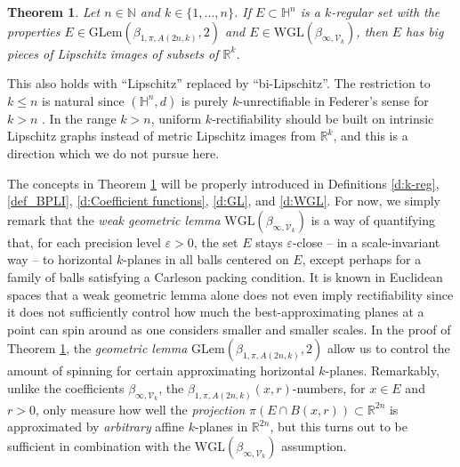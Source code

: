 \documentclass[12pt]{amsart}
\numberwithin{equation}{section}
\theoremstyle{plain}
\newtheorem{theorem}{Theorem}[section]
\theoremstyle{definition}
\theoremstyle{remark}
\begin{document}
\begin{theorem}\label{t:ImprovedHahlomaa}
Let $n\in \mathbb{N}$ and $k\in \{1,\ldots,n\}$. If $E\subset \mathbb{H}^n$ is a $k$-regular set with the properties $E\in \mathrm{GLem}(\beta_{1,\pi,A(2n,k)},2)$ and $E\in \mathrm{WGL}(\beta_{\infty,\mathcal{V}_k})$, then $E$ has big pieces of Lipschitz images of subsets of $\mathbb{R}^k$. 
\end{theorem}

This also holds with ``Lipschitz'' replaced by ``bi-Lipschitz''.
The restriction to $k\leq n$ is natural since  $(\mathbb{H}^n,d)$ is purely $k$-unrectifiable in Federer's sense for $k>n$ \cite{MR1800768,MR2105335}. In the range $k>n$,
uniform $k$-rectifiability should be built on intrinsic Lipschitz graphs \cite{MR2313532} instead of metric Lipschitz images from $\mathbb{R}^k$, and this is a direction which we do not pursue here. 


The concepts in Theorem \ref{t:ImprovedHahlomaa} will be properly introduced in Definitions \ref{d:k-reg}, \ref{def_BPLI}, \ref{d:Coefficient functions}, \ref{d:GL}, and \ref{d:WGL}. For now, we simply remark that the \emph{weak geometric lemma} $\mathrm{WGL}(\beta_{\infty,\mathcal{V}_k})$ is a way of quantifying that, for each precision level $\varepsilon >0$, the set $E$ stays $\varepsilon$-close -- in a scale-invariant way -- to horizontal $k$-planes in all balls centered on $E$, except perhaps for a family of balls satisfying a Carleson packing condition. It is known in Euclidean spaces that a weak geometric lemma alone does not even imply rectifiability \cite[\S 20]{David1} since it does not sufficiently control how much the best-approximating planes at a point can spin around as one considers smaller and smaller scales. In the proof of Theorem \ref{t:ImprovedHahlomaa}, the \emph{geometric lemma} $\mathrm{GLem}(\beta_{1,\pi,A(2n,k)},2)$  allow us to control the amount of spinning for certain approximating horizontal $k$-planes. Remarkably, unlike the coefficients $\beta_{\infty,\mathcal{V}_k}$, the $\beta_{1,\pi,A(2n,k)}(x,r)$-numbers, for $x\in E$ and $r>0$, only measure how well the \emph{projection} $\pi(E\cap B(x,r))\subset \mathbb{R}^{2n}$ is approximated by \emph{arbitrary} affine $k$-planes in $\mathbb{R}^{2n}$, but this turns out to be sufficient in combination with the $\mathrm{WGL}(\beta_{\infty,\mathcal{V}_k})$ assumption.
\end{document}
